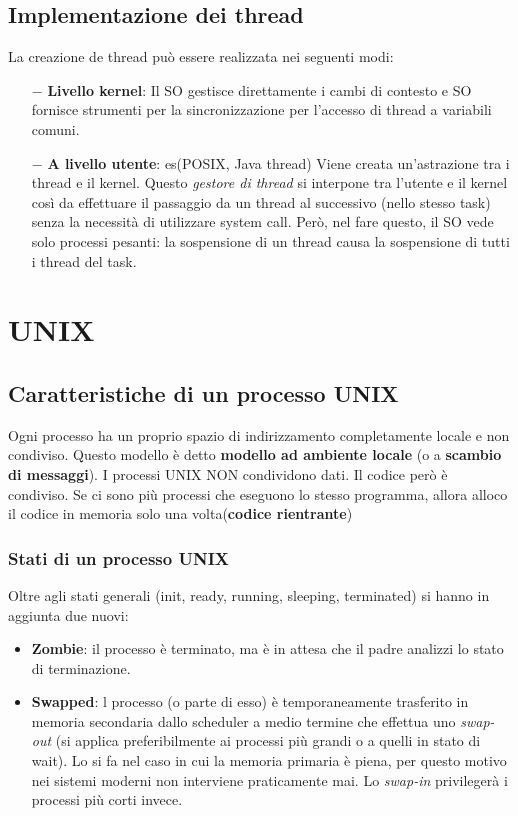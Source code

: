 \documentclass{article}
\begin{document}
\subsection{Implementazione dei thread}
La creazione de thread può essere realizzata nei seguenti modi:
\begin{itemize}
    \item [$-$] \textbf{Livello kernel}: Il SO 
    gestisce direttamente i cambi di contesto e SO fornisce
    strumenti per la sincronizzazione per l'accesso di thread a 
    variabili comuni.
    \item[$-$] \textbf{A livello utente}: es(POSIX, Java thread)
    Viene creata un'astrazione tra i thread e il kernel.
    Questo \textit{gestore di thread} si interpone tra l'utente 
    e il kernel così da effettuare il passaggio da un thread
    al successivo (nello stesso task) senza la necessità di utilizzare system call.   
    Però, nel fare questo, il SO vede solo processi pesanti: la sospensione
    di un thread causa la sospensione di tutti i thread del task.
\end{itemize}  

\pagebreak
\section{UNIX}
\subsection{Caratteristiche di un processo UNIX}

\noindent Ogni processo ha un proprio spazio di indirizzamento
completamente locale e non condiviso. Questo modello è detto 
\textbf{modello ad ambiente locale} (o a \textbf{scambio di messaggi}).
I processi UNIX NON condividono dati.
Il codice però è condiviso. Se ci sono più processi che eseguono lo stesso 
programma, allora alloco il codice in memoria solo una volta(\textbf{codice rientrante})



\subsubsection{Stati di un processo UNIX}
Oltre agli stati generali (init, ready, running, sleeping, terminated)
si hanno in aggiunta due nuovi:
\begin{itemize}
    \item \textbf{Zombie}: il processo è terminato, ma è in attesa che il padre
     analizzi lo stato di terminazione.
    \item \textbf{Swapped}: l processo (o parte di esso) è temporaneamente
    trasferito in memoria secondaria dallo scheduler a medio termine che
    effettua uno \textit{swap-out} (si applica preferibilmente ai processi
    più grandi o a quelli in stato di wait). Lo si fa nel caso in cui la memoria
    primaria è piena, per questo motivo nei sistemi moderni non interviene praticamente mai. 
    Lo \textit{swap-in} privilegerà i processi più corti invece. 
    
\end{itemize}
\end{document}
